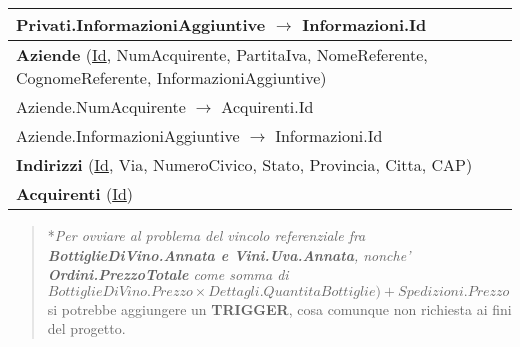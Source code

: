 \begin{center}
\begin{minipage}[t]{7.5cm}
{\begin{tabular}{P{7.5cm}}
				\midrule
				Privati.InformazioniAggiuntive $\to$ Informazioni.Id                                                                                                   \\                                
				\midrule
				 \textbf{Aziende} (\underline{Id}, NumAcquirente, PartitaIva, NomeReferente, CognomeReferente, InformazioniAggiuntive) \\
				\midrule
				Aziende.NumAcquirente $\to$ Acquirenti.Id                                                                                                              \\
				\midrule
				Aziende.InformazioniAggiuntive $\to$ Informazioni.Id                                                                                                   \\                                
				\midrule
				 \textbf{Indirizzi} (\underline{Id}, Via, NumeroCivico, Stato, Provincia, Citta, CAP) \\
				\midrule
				 \textbf{Acquirenti} (\underline{Id})                                                 \\                                
				\midrule
			\end{tabular}
		}
	\end{minipage}
	
	
	\begin{verse}
	*\emph{Per ovviare al problema del vincolo referenziale fra 	\textbf{BottiglieDiVino.Annata e Vini.Uva.Annata}, nonche' \textbf{Ordini.PrezzoTotale} come somma di $BottiglieDiVino.Prezzo \times Dettagli.QuantitaBottiglie)+ Spedizioni.Prezzo$} si potrebbe aggiungere un \textbf{TRIGGER}, cosa comunque non richiesta ai fini del progetto.
\end{verse}

\end{center}
